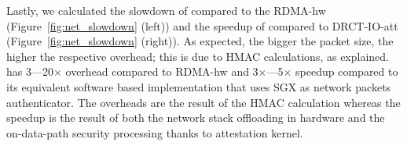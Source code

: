 

Lastly, we calculated the slowdown of \projecttitle{} compared to the RDMA-hw (Figure~\ref{fig:net_slowdown} (left)) and the speedup of \projecttitle{} compared to DRCT-IO-att  (Figure~\ref{fig:net_slowdown} (right)). As expected, the bigger the packet size, the higher the respective overhead; this is due to HMAC calculations, as explained.  \projecttitle{} has 3---20$\times$ overhead compared to RDMA-hw and 3$\times$---5$\times$ speedup compared to its equivalent software based implementation that uses SGX as network packets authenticator. The overheads are the result of the HMAC calculation whereas the speedup is the result of both the network stack offloading in hardware and the on-data-path security processing thanks to \projecttitle{} attestation kernel.